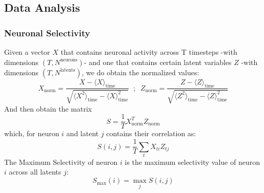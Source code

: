 \documentclass{article}
\begin{document}
\subsection*{Data Analysis}
\subsubsection*{Neuronal Selectivity}
Given a vector $X$ that contains neuronal activity across T timesteps -with dimensions $(T, N^\textrm{neurons})$- and one that contains certain latent variables $Z$ -with dimensions  $(T, N^\textrm{latents})$, we do obtain the normalized values:
\begin{equation}
    X_\textrm{norm} = \frac{X - \langle X \rangle_{\textrm{time}}}{\sqrt{\langle X^2 \rangle_\textrm{time} - \langle X \rangle_\textrm{time}^2}} \;\; ; \;\; Z_\textrm{norm} = \frac{Z - \langle Z \rangle_{\textrm{time}}}{\sqrt{\langle Z^2 \rangle_\textrm{time} - \langle Z \rangle_\textrm{time}^2}}
\end{equation} 
And then obtain the matrix 
\begin{equation}
    S = \frac{1}{T}X_\textrm{norm}^TZ_\textrm{norm}
\end{equation}
which, for neuron $i$ and latent $j$ contains their correlation as:
\begin{equation}
    S(i, j) = \frac{1}{T}\sum_t X_{ti}Z_{tj}
\end{equation}
The Maximum Selectivity of neuron $i$ is the maximum selectivity value of neuron $i$ across all latents $j$:
\begin{equation}
    S_\textrm{max}(i) = \max_{j}{S(i, j)}
\end{equation}
\end{document}
